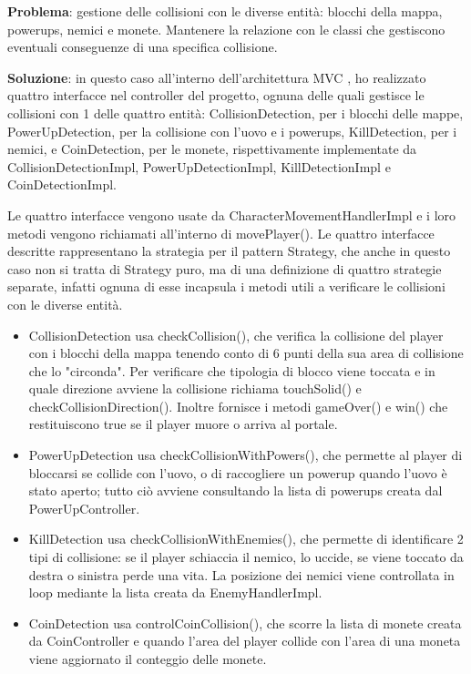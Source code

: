 \documentclass[a4paper,12pt]{report}
\begin{document}
\textbf{Problema}: gestione delle collisioni con le diverse entità: blocchi della mappa, powerups, nemici e monete. 
Mantenere la relazione con le classi che gestiscono eventuali conseguenze di una specifica collisione.\vspace{1cm}

\textbf{Soluzione}: in questo caso all'interno dell'architettura MVC , ho realizzato quattro interfacce nel controller del progetto, 
ognuna delle quali gestisce le collisioni con 1 delle quattro entità: CollisionDetection, per i blocchi delle mappe, PowerUpDetection, 
per la collisione con l'uovo e i powerups, KillDetection, per i nemici, e CoinDetection, per le monete, 
rispettivamente implementate da CollisionDetectionImpl, PowerUpDetectionImpl, KillDetectionImpl e CoinDetectionImpl.

Le quattro interfacce vengono usate da CharacterMovementHandlerImpl e i loro metodi vengono richiamati all'interno di movePlayer().
Le quattro interfacce descritte rappresentano la strategia per il pattern Strategy, che anche in questo caso non si tratta di Strategy puro, 
ma di una definizione di quattro strategie separate, infatti ognuna di esse incapsula i metodi utili a verificare le collisioni con le 
diverse entità.

\begin{itemize}
    \item CollisionDetection usa checkCollision(), che verifica la collisione del player con i blocchi della mappa tenendo conto di 6 punti 
    della sua area di collisione che lo "circonda". Per verificare che tipologia di blocco viene toccata e in quale direzione avviene
    la collisione richiama touchSolid() e checkCollisionDirection().
    Inoltre fornisce i metodi gameOver() e win() che restituiscono true se il player muore o arriva al portale.
    \item PowerUpDetection usa checkCollisionWithPowers(), che permette al player di bloccarsi se collide con l'uovo, o di raccogliere un 
    powerup quando l'uovo è stato aperto; tutto ciò avviene consultando la lista di powerups creata dal PowerUpController.
    \item KillDetection usa checkCollisionWithEnemies(), che permette di identificare 2 tipi di collisione: se il player schiaccia il nemico, 
    lo uccide, se viene toccato da destra o sinistra perde una vita. La posizione dei nemici viene controllata in loop mediante 
    la lista creata da EnemyHandlerImpl.
    \item CoinDetection usa controlCoinCollision(), che scorre la lista di monete creata da CoinController e quando l'area del player collide 
    con l'area di una moneta viene aggiornato il conteggio delle monete.
\end{itemize}
\end{document}
